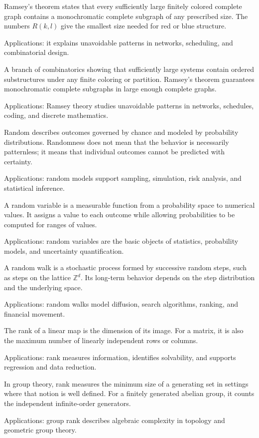 Ramsey's theorem states that every sufficiently large finitely colored complete graph contains a monochromatic complete subgraph of any prescribed size. The numbers $R(k,l)$ give the smallest size needed for red or blue structure. \par\noindent Applications: it explains unavoidable patterns in networks, scheduling, and combinatorial design.

A branch of combinatorics showing that sufficiently large systems contain ordered substructures under any finite coloring or partition. Ramsey's theorem guarantees monochromatic complete subgraphs in large enough complete graphs. \par\noindent Applications: Ramsey theory studies unavoidable patterns in networks, schedules, coding, and discrete mathematics.

Random describes outcomes governed by chance and modeled by probability distributions. Randomness does not mean that the behavior is necessarily patternless; it means that individual outcomes cannot be predicted with certainty. \par\noindent Applications: random models support sampling, simulation, risk analysis, and statistical inference.

A random variable is a measurable function from a probability space to numerical values. It assigns a value to each outcome while allowing probabilities to be computed for ranges of values. \par\noindent Applications: random variables are the basic objects of statistics, probability models, and uncertainty quantification.

A random walk is a stochastic process formed by successive random steps, such as steps on the lattice $\mathbb Z^d$. Its long-term behavior depends on the step distribution and the underlying space. \par\noindent Applications: random walks model diffusion, search algorithms, ranking, and financial movement.

The rank of a linear map is the dimension of its image. For a matrix, it is also the maximum number of linearly independent rows or columns. \par\noindent Applications: rank measures information, identifies solvability, and supports regression and data reduction.

In group theory, rank measures the minimum size of a generating set in settings where that notion is well defined. For a finitely generated abelian group, it counts the independent infinite-order generators. \par\noindent Applications: group rank describes algebraic complexity in topology and geometric group theory.

